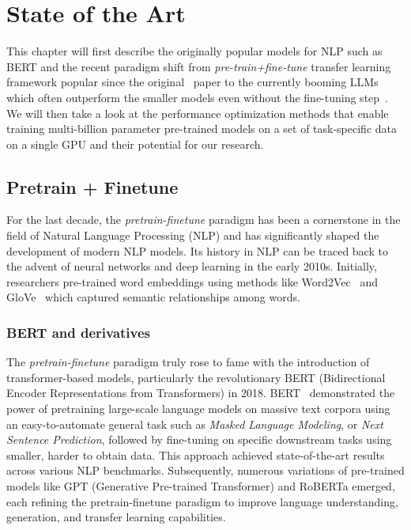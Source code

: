
\chapter{State of the Art}

This chapter will first describe the originally popular models for NLP such as BERT and the recent paradigm shift from \textit{pre-train+fine-tune} transfer learning framework popular since the original~\cite{devlin2019bert} paper to the currently booming LLMs which often outperform the smaller models even without the fine-tuning step~\cite{gpt4,llama,vicuna}. We will then take a look at the performance optimization methods that enable training multi-billion parameter pre-trained models on a set of task-specific data on a single GPU and their potential for our research. 

\label{chap:sota}
\section{Pretrain + Finetune}
\label{sec:pretrain}
For the last decade, the \textit{pretrain-finetune} paradigm has been a cornerstone in the field of Natural Language Processing (NLP) and has significantly shaped the development of modern NLP models. Its history in NLP can be traced back to the advent of neural networks and deep learning in the early 2010s. Initially, researchers pre-trained word embeddings using methods like Word2Vec~\cite{mikolov} and GloVe~\cite{pennington-etal-2014-glove} which captured semantic relationships among words. 

\subsection{BERT and derivatives}
The \textit{pretrain-finetune} paradigm truly rose to fame with the introduction of transformer-based models, particularly the revolutionary BERT (Bidirectional Encoder Representations from Transformers) in 2018. BERT~\cite{bert} demonstrated the power of pretraining large-scale language models on massive text corpora using an easy-to-automate general task such as \textit{Masked Language Modeling}, or \textit{Next Sentence Prediction}, followed by fine-tuning on specific downstream tasks using smaller, harder to obtain data. This approach achieved state-of-the-art results across various NLP benchmarks. Subsequently, numerous variations of pre-trained models like GPT (Generative Pre-trained Transformer) and RoBERTa emerged, each refining the pretrain-finetune paradigm to improve language understanding, generation, and transfer learning capabilities. 

